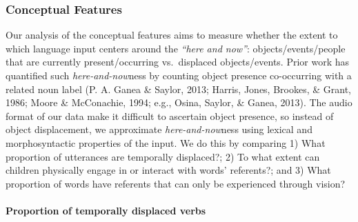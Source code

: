 \documentclass[
  man]{apa6}
\let\oldparagraph\paragraph
\renewcommand{\paragraph}[1]{\oldparagraph{#1}\mbox{}}
\begin{document}
\hypertarget{conceptual-features}{%
\subsubsection{Conceptual Features}\label{conceptual-features}}

Our analysis of the conceptual features aims to measure whether the extent to which language input centers around the \emph{``here and now''}: objects/events/people that are currently present/occurring vs.~displaced objects/events. Prior work has quantified such \emph{here-and-now}ness by counting object presence co-occurring with a related noun label (P. A. Ganea \& Saylor, 2013; Harris, Jones, Brookes, \& Grant, 1986; Moore \& McConachie, 1994; e.g., Osina, Saylor, \& Ganea, 2013). The audio format of our data make it difficult to ascertain object presence, so instead of object displacement, we approximate \emph{here-and-now}ness using lexical and morphosyntactic properties of the input. We do this by comparing 1) What proportion of utterances are temporally displaced?; 2) To what extent can children physically engage in or interact with words' referents?; and 3) What proportion of words have referents that can only be experienced through vision?

\hypertarget{proportion-of-temporally-displaced-verbs}{%
\paragraph{Proportion of temporally displaced verbs}\label{proportion-of-temporally-displaced-verbs}}
\end{document}
